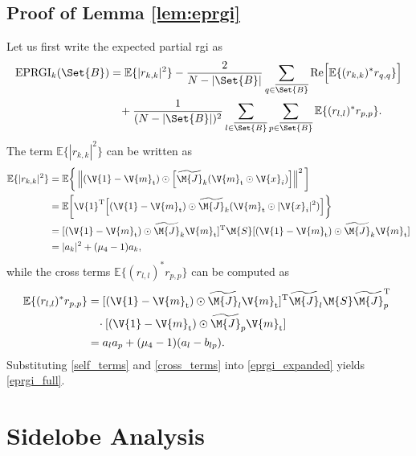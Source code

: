 \documentclass[journal,a4paper,10pt, romanappendices]{IEEEtran}
\begin{document}
\subsection{Proof of Lemma \ref{lem:eprgi}}\label{sec:proof_eprgi}
\begin{IEEEproof}
Let us first write the expected partial \ac{rgi} as
\begin{align}\label{eprgi_expanded}
{\rm EPRGI}_k(\Set{B}) &= \mathbb{E}\{|r_{k,k}|^2\} -\frac{2}{N-|\Set{B}|}\sum_{q\in\overline{\Set{B}}}{\rm Re}\Big[\mathbb{E}\{(r_{k,k})^*r_{q,q}\}\Big] \nonumber\\
&\hspace{3mm}+ \frac{1}{(N-|\Set{B}|)^2}\sum_{l\in\overline{\Set{B}}}\sum_{p\in\overline{\Set{B}}}\mathbb{E}\{(r_{l,l})^*r_{p,p}\}.
\end{align}
The term $\mathbb{E}\{|r_{k,k}|^2\}$ can be written as
\begin{align}\label{self_terms}
\mathbb{E}\{|r_{k,k}|^2\}&= \mathbb{E}\bigg\{\left\|(\V{1}-\V{m}_{\rm t})\odot \left[\widetilde{\M{J}}_k(\V{m}_{\rm t}\odot\V{x}_i)\right]\right\|^2\bigg]\nonumber\\
&=\mathbb{E}\bigg[\V{1}^{\rm T}\Big[(\V{1}-\V{m}_{\rm t})\odot \widetilde{\M{J}}_k (\V{m}_{\rm t}\odot |\V{x}_i|^2)\Big]\bigg\}\nonumber\\
&=[(\V{1}-\V{m}_{\rm t})\odot \widetilde{\M{J}}_k \V{m}_{\rm t}]^{\rm T}\M{S}[(\V{1}-\V{m}_{\rm t})\odot \widetilde{\M{J}}_k \V{m}_{\rm t}]\nonumber\\
&=|a_k|^2+(\mu_4-1)a_k,
\end{align}
while the cross terms $\mathbb{E}\{(r_{l,l})^*r_{p,p}\}$ can be computed as
\begin{align}\label{cross_terms}
\mathbb{E}\{(r_{l,l})^*r_{p,p}\} &= [(\V{1}-\V{m}_{\rm t})\odot \widetilde{\M{J}}_l \V{m}_{\rm t}]^{\rm T}\widetilde{\M{J}}_l\M{S}\widetilde{\M{J}}_p^{\rm T}\
\nonumber\\
&\hspace{3mm}\cdot [(\V{1}-\V{m}_{\rm t})\odot \widetilde{\M{J}}_p \V{m}_{\rm t}]\nonumber\\
&=a_l a_p +(\mu_4-1) (a_l -b_{lp}).
\end{align}
Substituting \eqref{self_terms} and \eqref{cross_terms} into \eqref{eprgi_expanded} yields \eqref{eprgi_full}.
\end{IEEEproof}

\section{Sidelobe Analysis}
\end{document}
